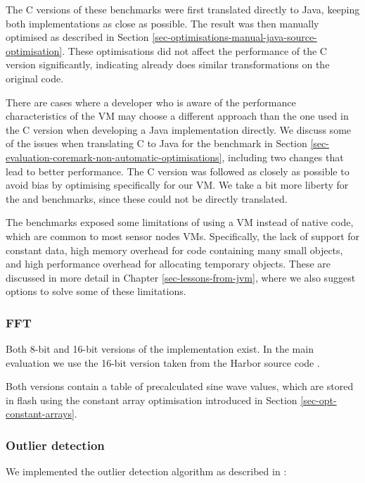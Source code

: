 The C versions of these benchmarks were first translated directly to Java, keeping both implementations as close as possible. The result was then manually optimised as described in Section \ref{sec-optimisations-manual-java-source-optimisation}. These optimisations did not affect the performance of the C version significantly, indicating  already does similar transformations on the original code.

There are cases where a developer who is aware of the performance characteristics of the VM may choose a different approach than the one used in the C version when developing a Java implementation directly. We discuss some of the issues when translating C to Java for the  benchmark in Section \ref{sec-evaluation-coremark-non-automatic-optimisations}, including two changes that lead to better performance. The C version was followed as closely as possible to avoid bias by optimising specifically for our VM. We take a bit more liberty for the  and  benchmarks, since these could not be directly translated.

The benchmarks exposed some limitations of using a VM instead of native code, which are common to most sensor nodes VMs. Specifically, the lack of support for constant data, high memory overhead for code containing many small objects, and high performance overhead for allocating temporary objects. These are discussed in more detail in Chapter \ref{sec-lessons-from-jvm}, where we also suggest options to solve some of these limitations.

\subsubsection{FFT}
Both 8-bit and 16-bit versions of the  implementation exist. In the main evaluation we use the 16-bit version taken from the Harbor source code \cite{sos-operating-system}.

Both versions contain a table of precalculated sine wave values, which are stored in flash using the constant array optimisation introduced in Section \ref{sec-opt-constant-arrays}.

\subsubsection{Outlier detection}
We implemented the outlier detection algorithm as described in \cite{Kumar:2007ge}:

